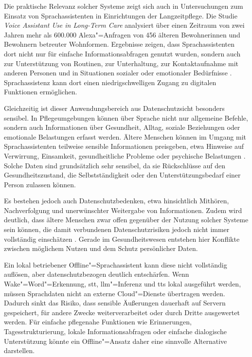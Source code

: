 Die praktische Relevanz solcher Systeme zeigt sich auch in Untersuchungen zum Einsatz von Sprachassistenten in Einrichtungen der Langzeitpflege. Die Studie \textit{Voice Assistant Use in Long-Term Care} \autocite{VoiceAssistantUseInLongTerm} analysiert über einen Zeitraum von zwei Jahren mehr als 600.000 Alexa"=Anfragen von 456 älteren Bewohnerinnen und Bewohnern betreuter Wohnformen. Ergebnisse zeigen, dass Sprachassistenten dort nicht nur für einfache Informationsabfragen genutzt wurden, sondern auch zur Unterstützung von Routinen, zur Unterhaltung, zur Kontaktaufnahme mit anderen Personen und in Situationen sozialer oder emotionaler Bedürfnisse \autocite{VoiceAssistantUseInLongTerm}. Sprachassistenz kann dort einen niedrigschwelligen Zugang zu digitalen Funktionen ermöglichen.

Gleichzeitig ist dieser Anwendungsbereich aus Datenschutzsicht besonders sensibel. In Pflegeumgebungen können über Sprache nicht nur allgemeine Befehle, sondern auch Informationen über Gesundheit, Alltag, soziale Beziehungen oder emotionale Belastungen erfasst werden. Ältere Menschen können im Umgang mit Sprachassistenten teilweise sensible Informationen preisgeben, etwa Hinweise auf Verwirrung, Einsamkeit, gesundheitliche Probleme oder psychische Belastungen \autocite{VoiceAssistantUseInLongTerm}. Solche Daten sind grundsätzlich sehr sensibel, da sie Rückschlüsse auf den Gesundheitszustand, die Selbstständigkeit oder den Unterstützungsbedarf einer Person zulassen können.

Es bestehen jedoch auch Datenschutzbedenken, etwa hinsichtlich Mithören, Nachverfolgung und unerwünschter Weitergabe von Informationen. Zudem wird deutlich, dass ältere Menschen zwar offen gegenüber der Nutzung solcher Systeme sein können, die damit verbundenen Datenschutzrisiken jedoch nicht immer vollständig einschätzen \autocite{privacyConcernsOlderPeople}. Gerade im Gesundheitswesen entstehen hier Konflikte zwischen möglichem Nutzen und dem Schutz persönlicher Daten.

Ein lokal betriebener Offline"=Sprachassistent kann diese nicht vollständig auflösen, aber datenschutzbezogen deutlich entschärfen. Wenn Wake"=Word"=Erkennung, \gls{stt}, \gls{llm}"=Inferenz und \gls{tts} lokal ausgeführt werden, müssen Sprachdaten nicht an externe Cloud"=Dienste übertragen werden. Dadurch sinkt das Risiko, dass sensible Äußerungen dauerhaft auf Servern gespeichert, für andere Zwecke weiterverarbeitet oder durch Dritte ausgewertet werden. Für einfache pflegenahe Funktionen wie Erinnerungen, Tagesstrukturierung, lokale Informationsabfragen oder einfache dialogische Unterstützung könnte ein Offline"=Ansatz daher eine sinnvolle Alternative darstellen.


